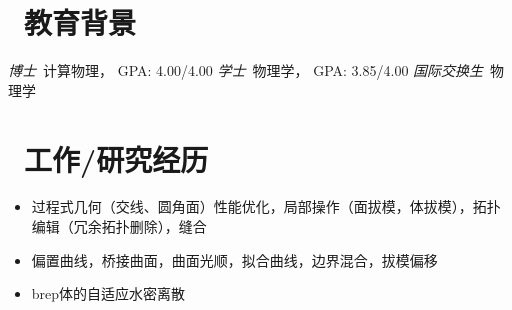 \documentclass{resume}
\begin{document}


 
\section{\faGraduationCap\  教育背景}
\textit{博士}\ 计算物理， GPA: 4.00/4.00
\textit{学士}\ 物理学， GPA: 3.85/4.00
\textit{国际交换生}\ 物理学

\section{\faFlask\ 工作/研究经历}
\begin{onehalfspacing}
\begin{itemize}
  \item 过程式几何（交线、圆角面）性能优化，局部操作（面拔模，体拔模），拓扑编辑（冗余拓扑删除），缝合
\end{itemize}
\end{onehalfspacing}

\begin{onehalfspacing}
\begin{itemize}
  \item 偏置曲线，桥接曲面，曲面光顺，拟合曲线，边界混合，拔模偏移
\end{itemize}
\end{onehalfspacing}


\begin{onehalfspacing}
\begin{itemize}
  \item brep体的自适应水密离散
\end{itemize}
\end{onehalfspacing}
\end{document}
